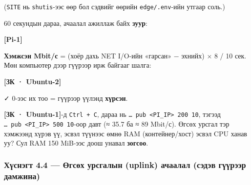 (\texttt{SITE} нь \texttt{shutis}-ээс өөр бол сэдвийг өөрийн \texttt{edge/.env}-ийн утгаар соль.)

60 секундын дараа, ачаалал ажиллаж байх \textbf{зуур}:

\textbf{{[}Pi-1{]}}

\begin{Shaded}
\begin{Highlighting}[]
\end{Highlighting}
\end{Shaded}

\textbf{Хэмжсэн Mbit/с} = (хоёр дахь NET I/O-ийн «гарсан» − эхнийх) × 8 / 10 сек. Мөн компьютер дээр гүүрээр ирж байгааг шалга:

\textbf{{[}ЗК · Ubuntu-2{]}}

\begin{Shaded}
\begin{Highlighting}[]
\KeywordTok{|} 
\end{Highlighting}
\end{Shaded}

✓ 0-ээс их тоо = гүүрээр үүлэнд \textbf{хүрсэн}.

\textbf{{[}ЗК · Ubuntu-1{]}}-д \texttt{Ctrl\ +\ C}, дараа нь \texttt{\ldots{}\ pub\ \textless{}PI\_\allowbreak{}IP\textgreater{}\ 200\ 10}, тэгээд \texttt{\ldots{}\ pub\ \textless{}PI\_\allowbreak{}IP\textgreater{}\ 500\ 10}-оор давт (≈ 35.7 ба ≈ 89 Mbit/с). Өгсөх урсгал тэр хэмжээнд хүрэв үү, эсвэл түүнээс өмнө RAM (контейнер/хост) эсвэл CPU ханав уу? Сул RAM 150 MiB-ээс доош унавал \textbf{зогсоо}.

\hypertarget{ux445ux4afux441ux43dux44dux433ux442-4.4-ux4e9ux433ux441ux4e9ux445-ux443ux440ux441ux433ux430ux43bux44bux43d-uplink-ux430ux447ux430ux430ux43bux430ux43b-ux441ux44dux434ux44dux432-ux433ux4afux4afux440ux44dux44dux440-ux434ux430ux43cux436ux438ux43dux430}{%
\subsubsection{Хүснэгт 4.4 --- Өгсөх урсгалын (uplink) ачаалал (сэдэв гүүрээр дамжина)}\label{ux445ux4afux441ux43dux44dux433ux442-4.4-ux4e9ux433ux441ux4e9ux445-ux443ux440ux441ux433ux430ux43bux44bux43d-uplink-ux430ux447ux430ux430ux43bux430ux43b-ux441ux44dux434ux44dux432-ux433ux4afux4afux440ux44dux44dux440-ux434ux430ux43cux436ux438ux43dux430}}

